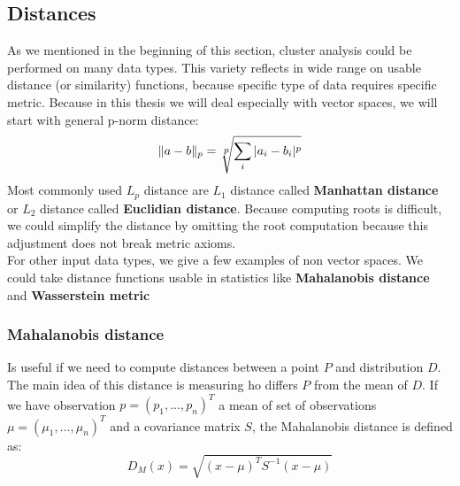 \subsection{Distances}
As we mentioned in the beginning of this section, cluster analysis could be performed on many data types. This variety reflects in wide range on usable distance (or similarity) functions, because specific type of data requires specific metric. Because in this thesis we will deal especially with vector spaces, we will start with general p-norm distance: $$\|a-b\|_p=\sqrt[\leftroot{-1}\uproot{3}\scriptstyle p]{\sum_i |a_i - b_i|^p} $$
Most commonly used $L_p$ distance are $L_1$ distance called \textbf{Manhattan distance} or $L_2$ distance called \textbf{Euclidian distance}.
Because computing roots is difficult, we could simplify the distance by omitting the root computation because this adjustment does not break metric axioms.\\

For other input data types, we give a few examples of non vector spaces. We could take distance functions usable in statistics like \textbf{Mahalanobis distance} and \textbf{Wasserstein metric}

\subsubsection{Mahalanobis distance}
Is useful if we need to compute distances between a point $P$ and distribution $D$. The main idea of this distance is measuring ho differs $P$ from the mean of $D$.
If we have observation $p=(p_1,...,p_n)^T$ a mean of set of observations $\mu=(\mu_1,...,\mu_n)^T$ and a covariance matrix $S$, the Mahalanobis distance is defined as:
$$D_M(x) = \sqrt{(x - \mu)^T S^{-1} (x-\mu)}$$

